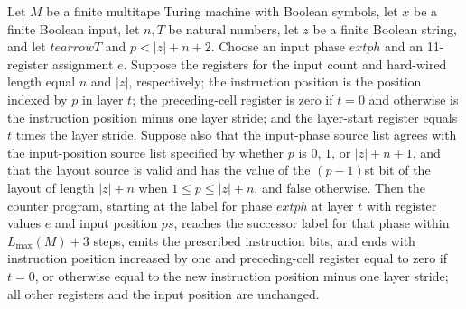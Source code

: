 \begin{theorem}
\label{Complexity.UTab.goes_inp_one}
\leanok
{}
Let $M$ be a finite multitape Turing machine with Boolean symbols, let $x$ be a finite
Boolean input, let $n,T$ be natural numbers, let $z$ be a finite Boolean string, and let
$t
earrow T$ and $p<|z|+n+2$. Choose an input phase $	ext{ph}$ and an 11-register
assignment $e$. Suppose the registers for the input count and hard-wired length equal
$n$ and $|z|$, respectively; the instruction position is the position indexed by $p$ in
layer $t$; the preceding-cell register is zero if $t=0$ and otherwise is the instruction
position minus one layer stride; and the layer-start register equals $t$ times the layer
stride. Suppose also that the input-phase source list agrees with the input-position
source list specified by whether $p$ is $0$, $1$, or $|z|+n+1$, and that the layout
source is valid and has the value of the $(p-1)$st bit of the layout of length $|z|+n$
when $1\le p\le |z|+n$, and false otherwise. Then the counter program, starting at the
label for phase $	ext{ph}$ at layer $t$ with register values $e$ and input position
$ps$, reaches the successor label for that phase within $L_{\max}(M)+3$ steps, emits the
prescribed instruction bits, and ends with instruction position increased by one and
preceding-cell register equal to zero if $t=0$, or otherwise equal to the new
instruction position minus one layer stride; all other registers and the input position
are unchanged.
\end{theorem}

